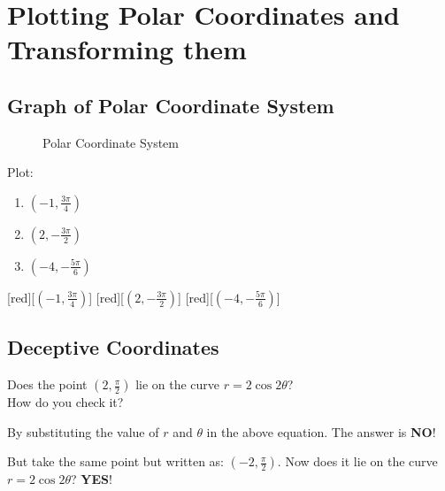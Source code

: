 \chapter{Plotting Polar Coordinates and Transforming them}
\label{chap:plotting-polar-coordinates-and-transforming-them}

\section{Graph of Polar Coordinate System}
\label{sec:graph-polar-coord-sys}
\begin{figure}[H]
  \centering
  \begin{polargrid}[4][4][12][4.5][1]
  \end{polargrid}
  \caption{Polar Coordinate System}
  \label{fig:polar-coord-sys-graph}
\end{figure}

\begin{exercise}
  Plot:
  \begin{enumerate}
    \item \((-1,\frac{3\pi}{4})\)
    \item \((2,-\frac{3\pi}{2})\)
    \item \((-4,-\frac{5\pi}{6})\)
  \end{enumerate}
\end{exercise}
\begin{answer}
  \begin{polargrid}[4][4][24][4.5][1]
    [red][$(-1, \frac{3\pi}{4})$]
    [red][$(2, -\frac{3\pi}{2})$]
    [red][$(-4, -\frac{5\pi}{6})$]
  \end{polargrid}
\end{answer}

\section{Deceptive Coordinates}
\label{sec:polar-deceptive-coord}
\begin{problem}
  Does the point \((2,\frac{\pi}{2})\) lie on the curve \(r=2\cos 2\theta\)?\\
  How do you check it?
  \begin{answer}
    By substituting the value of \(r\) and \(\theta\) in the above equation.
    The answer is \textbf{NO}!
  \end{answer}
  But take the same point but written as: \((-2,\frac{\pi}{2})\). Now does it
  lie on the curve \(r=2\cos 2\theta\)? \textbf{YES}!
\end{problem}

